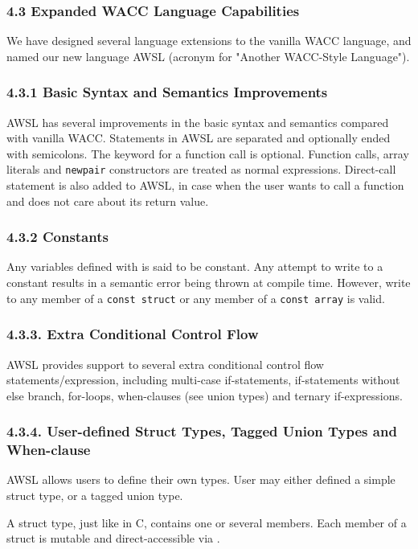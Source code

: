 \documentclass[10pt,a4paper]{report}
\begin{document}
  \subsubsection*{4.3 Expanded WACC Language Capabilities}
  We have designed several language extensions to the vanilla WACC language, and
  named our new language AWSL (acronym for "Another WACC-Style Language").

  \subsubsection*{4.3.1 Basic Syntax and Semantics Improvements}
  AWSL has several improvements in the basic syntax and semantics compared with
  vanilla WACC. Statements in AWSL are separated and optionally ended with
  semicolons. The  keyword for a function call is optional.
  Function calls, array literals and \texttt{newpair} constructors are treated
  as normal expressions. Direct-call statement is also added to AWSL, in case
  when the user wants to call a function and does not
  care about its return value.

  \subsubsection*{4.3.2 Constants}
  Any variables defined with  is said to be constant. Any attempt
  to write to a constant results in a semantic error being thrown at compile
  time. However, write to any member of a \texttt{const struct} or any member of
  a \texttt{const array} is valid. 

  \subsubsection*{4.3.3. Extra Conditional Control Flow}
  AWSL provides support to several extra conditional control flow
  statements/expression, including multi-case if-statements, if-statements
  without else branch, for-loops, when-clauses (see union types) and ternary
  if-expressions. 

  \subsubsection*{4.3.4. User-defined Struct Types, Tagged Union Types and When-clause}
  AWSL allows users to define their own types. User may either defined a simple
  struct type, or a tagged union type.

  A struct type, just like  in C, contains one or several
  members. Each member of a struct is mutable and direct-accessible via
  .
\end{document}
